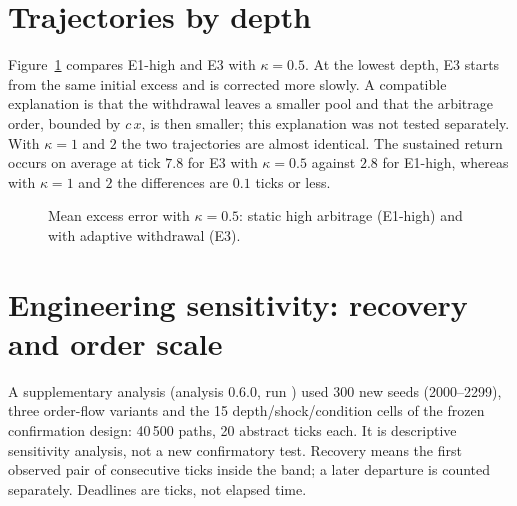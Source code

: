 \section{Trajectories by depth}

Figure~\ref{fig:prof} compares E1-high and E3 with $\kappa=0.5$. At the lowest depth, E3 starts from the same initial excess and is corrected more slowly. A compatible explanation is that the withdrawal leaves a smaller pool and that the arbitrage order, bounded by $c\,x$, is then smaller; this explanation was not tested separately. With $\kappa=1$ and $2$ the two trajectories are almost identical. The sustained return occurs on average at tick $7.8$ for E3 with $\kappa=0.5$ against $2.8$ for E1-high, whereas with $\kappa=1$ and $2$ the differences are $0.1$ ticks or less.

\begin{figure}[htbp]
\centering
{}
\caption{Mean excess error with $\kappa=0.5$: static high arbitrage (E1-high) and with adaptive withdrawal (E3).}
\label{fig:prof}
\end{figure}

\section{Engineering sensitivity: recovery and order scale}
\label{sec:engineering-sensitivity}

A supplementary analysis (analysis 0.6.0, run \code{\EngineeringRunID}) used 300 new seeds (2000--2299), three order-flow variants and the 15 depth/shock/condition cells of the frozen confirmation design: 40\,500 paths, 20 abstract ticks each. It is descriptive sensitivity analysis, not a new confirmatory test. Recovery means the first observed pair of consecutive ticks inside the band; a later departure is counted separately. Deadlines are ticks, not elapsed time.

